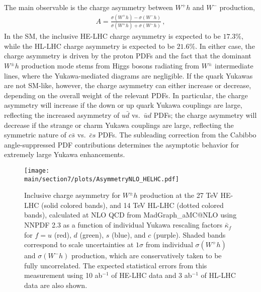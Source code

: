 \documentclass[../report.tex]{subfiles}
\providecommand{\main}{..}
\begin{document}
The main observable is the charge asymmetry between $W^+ h$ and $W^-$
production,
%
\begin{align}
	A 
= 	\frac{ \sigma (W^+ h) - \sigma (W^- h)}
	{\sigma (W^+ h) + \sigma (W^- h) } \, ,
\end{align}
%
In the SM, the inclusive HE-LHC charge asymmetry is expected to be $17.3\%$, while the HL-LHC charge asymmetry is expected to be $21.6\%$.  In either
case, the charge asymmetry is driven by the proton PDFs and the fact
that the dominant $W^\pm h$ production mode stems from Higgs bosons
radiating from $W^\pm$ intermediate lines, where the Yukawa-mediated
diagrams are negligible.  If the quark Yukawas are not SM-like,
however, the charge asymmetry can either increase or decrease,
depending on the overall weight of the relevant PDFs.  In particular,
the charge asymmetry will increase if the down or up quark Yukawa
couplings are large, reflecting the increased asymmetry of $u \bar{d}$
vs.~$\bar{u} d$ PDFs; the charge asymmetry will decrease if the
strange or charm Yukawa couplings are large, reflecting the symmetric
nature of $c \bar{s}$ vs.~$\bar{c} s$ PDFs.  The subleading correction
from the Cabibbo angle-suppressed PDF contributions determines the
asymptotic behavior for extremely large Yukawa enhancements.

\begin{figure}[tb!]
  \begin{center}
 \texttt{[image: \\main/section7/plots/AsymmetryNLO\_HELHC.pdf]}
 \caption{Inclusive charge asymmetry for $W^\pm h$ production at the
   27 TeV HE-LHC (solid colored bands), and 14 TeV HL-LHC (dotted
   colored bands), calculated at NLO QCD from MadGraph\_aMC@NLO using
   NNPDF 2.3 as a function of individual Yukawa rescaling factors
   $\bar{\kappa}_f$ for $f = u$ (red), $d$ (green), $s$ (blue), and
   $c$ (purple).  Shaded bands correspond to scale uncertainties at
   $1\sigma$ from individual $\sigma(W^+ h)$ and $\sigma(W^- h)$
   production, which are conservatively taken to be fully
   uncorrelated.  The expected statistical errors from this
   measurement using 10 ab$^{-1}$ of HE-LHC data and 3 ab$^{-1}$ of
   HL-LHC data are also shown.}
  \label{fig:asymmetry}
  \end{center}
\end{figure}
\end{document}
